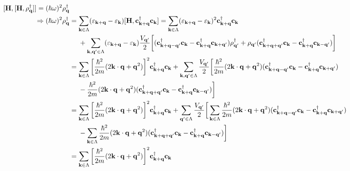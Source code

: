 \begin{equation}
\begin{split}
    [{\bf H}, [{\bf H}, \rho_{\bf q}^\dagger]] = (\hbar \omega)^2 \rho_{{\bf q}}^\dagger \\
    \Rightarrow (\hbar \omega)^2 \rho_{{\bf q}}^\dagger &= \sum_{{\bf k} \in \Lambda} (\varepsilon_{{\bf k + q}} - \varepsilon_{{\bf k}}) [{\bf H}, {\bf c}_{{\bf {\bf k} + q}}^\dagger {\bf c}_{{\bf k}}] = \sum_{{\bf k} \in \Lambda} (\varepsilon_{{\bf k + q}} - \varepsilon_{{\bf k}})^2 {\bf c}_{{\bf k + q}}^\dagger {\bf c}_{{\bf k}} \\
    & \blanky \blanky \blanky \blanky+ \sum_{{\bf k}, {\bf q}' \in \Lambda} (\varepsilon_{{\bf k + q}} - \varepsilon_{{\bf k}}) \frac{V_{{\bf q}'}}{2} \bigg[({\bf c}_{{\bf {\bf k} + q - q'}}^\dagger {\bf c}_{{\bf k}} - {\bf c}_{{\bf k + q}}^\dagger {\bf c}_{{\bf {\bf k} + q'}}) \rho_{{\bf q}'}^\dagger + \rho_{{\bf q}'} ({\bf c}_{{\bf {\bf k} + q + q'}}^\dagger {\bf c}_{{\bf k}} - {\bf c}_{{\bf k + q}}^\dagger {\bf c}_{{\bf {\bf k} - q'}})\bigg] \\
    &= \sum_{{\bf k} \in \Lambda} \bigg[ \frac{\hbar^2}{2m} (2 {\bf k} \cdot {\bf q} + {\bf q}^2)\bigg]^2 {\bf c}_{{\bf k}+{\bf q}}^\dagger {\bf c}_{{\bf k}} + \sum_{{\bf k}, {\bf q}' \in \Lambda} \frac{V_{\bf q'}}{2}\bigg[\frac{\hbar^2}{2m}(2 {\bf k}\cdot {\bf q} + {\bf q}^2) ({\bf c}_{{\bf {\bf k} + q - q'}}^\dagger {\bf c}_{{\bf k}} - {\bf c}_{{\bf k + q}}^\dagger {\bf c}_{{\bf {\bf k} + q'}}) \\ & \blanky \blanky \blanky \blanky - \frac{\hbar^2}{2m}(2 {\bf k}\cdot {\bf q} + {\bf q}^2) ({\bf c}_{{\bf {\bf k} + q + q'}}^\dagger {\bf c}_{{\bf k}} - {\bf c}_{{\bf k + q}}^\dagger {\bf c}_{{\bf {\bf k} - q'}})\bigg] \\
    &= \sum_{{\bf k} \in \Lambda} \bigg[ \frac{\hbar^2}{2m} (2 {\bf k} \cdot {\bf q} + {\bf q}^2)\bigg]^2 {\bf c}_{{\bf k}+{\bf q}}^\dagger {\bf c}_{{\bf k}} + \sum_{{\bf q}' \in \Lambda} \frac{V_{\bf q'}}{2} \bigg[ \sum_{{\bf k} \in \Lambda}\frac{\hbar^2}{2m}(2 {\bf k}\cdot {\bf q} + {\bf q}^2) ({\bf c}_{{\bf {\bf k} + q - q'}}^\dagger {\bf c}_{{\bf k}} - {\bf c}_{{\bf k + q}}^\dagger {\bf c}_{{\bf {\bf k} + q'}}) \\ 
    & \blanky \blanky \blanky \blanky - \sum_{{\bf k} \in \Lambda}\frac{\hbar^2}{2m}(2 {\bf k}\cdot {\bf q} + {\bf q}^2) ({\bf c}_{{\bf {\bf k} + q + q'}}^\dagger {\bf c}_{{\bf k}} - {\bf c}_{{\bf k + q}}^\dagger {\bf c}_{{\bf {\bf k} -
    q'}})\bigg] \\
    &= \sum_{{\bf k} \in \Lambda} \bigg[ \frac{\hbar^2}{2m} (2 {\bf k} \cdot {\bf q} + {\bf q}^2)\bigg]^2 {\bf c}_{{\bf k}+{\bf q}}^\dagger {\bf c}_{{\bf k}} \\

\end{split}
\end{equation}
